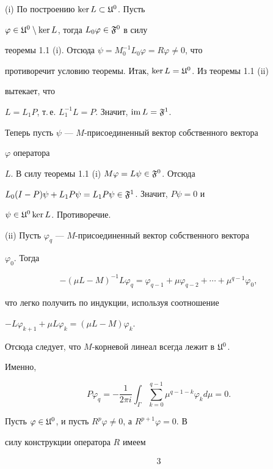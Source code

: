 \begin{pf} (i) По построению $\ker L\subset\frak U^0$. Пусть 


$\varphi\in\frak U^0\setminus\ker L$, тогда $L_0\varphi\in\frak F^0$ в силу 


теоремы 1.1 (i). Отсюда $\psi=M_0^{-1}L_0\varphi=R\varphi\ne 0$, что 


противоречит условию теоремы. Итак, $\ker L=\frak U^0$. Из теоремы 1.1 (ii) 


вытекает, что 


$L=L_1P$, т.\,е. $L_1^{-1}L=P$. Значит, $\operatorname{im} L=\frak F^1$. 


 


Теперь пусть $\psi$ --- $M$-присоединенный вектор собственного вектора 


$\varphi$ оператора 


$L$. В силу теоремы 1.1 (i) $M\varphi=L\psi\in\frak F^0$. Отсюда 


$L_0(I-P)\psi+L_1P\psi=L_1P\psi\in\frak F^1$. Значит, $P\psi=0$ и 


$\psi\in\frak U^0\ker L$. Противоречие. 


 


(ii) Пусть $\varphi_q$ --- $M$-присоединенный вектор собственного вектора 


$\varphi_0$. Тогда 


$$ 


-(\mu L-M)^{-1}L\varphi_q=\varphi_{q-1}+\mu\varphi_{q-2}+\dotsb 


+\mu^{q-1}\varphi_0, 


$$ 


что легко получить по индукции, используя соотношение 


$-L\varphi_{k+1}+\mu L\varphi_k=(\mu L-M)\varphi_k$. 


Отсюда следует, что $M$-корневой линеал всегда лежит в $\frak U^0$. 


Именно, 


$$ 


P\varphi_q=-\frac{1}{2\pi i}\int_\Gamma\sum^{q-1}_{k=0}\mu^{q-1-k} 


\varphi_kd\mu=0. 


$$ 


Пусть $\varphi\in\frak U^0$, и пусть $R^p\varphi\ne 0$, а $R^{p+1}\varphi=0$. В 


силу конструкции оператора $R$ имеем 


%


\begin{alignat*}{3}



\end{alignat*}
\end{pf}
